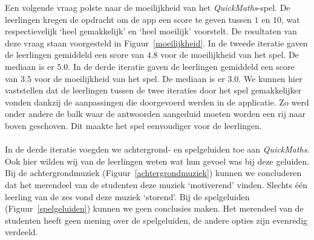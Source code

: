 \documentclass[11pt]{article}
\begin{document}
Een volgende vraag polste naar de moeilijkheid van het \textit{QuickMaths}-spel. De leerlingen kregen de opdracht om de app een score te geven tussen $1$ en $10$, wat respectievelijk `heel gemakkelijk' en `heel moeilijk' voorstelt. De resultaten van deze vraag staan voorgesteld in Figuur~\ref{moeilijkheid}.
In de tweede iteratie gaven de leerlingen gemiddeld een score van $4.8$ voor de moeilijkheid van het spel. De mediaan is er $5.0$.
In de derde iteratie gaven de leerlingen gemiddeld een score van $3.5$ voor de moeilijkheid van het spel. De mediaan is er $3.0$.
We kunnen hier vaststellen dat de leerlingen tussen de twee iteraties door het spel gemakkelijker vonden dankzij de aanpassingen die doorgevoerd werden in de applicatie. Zo werd onder andere de balk waar de antwoorden aangeduid moeten worden een rij naar boven geschoven. Dit maakte het spel eenvoudiger voor de leerlingen.\\\\
In de derde iteratie voegden we achtergrond- en spelgeluiden toe aan \textit{QuickMaths}. Ook hier wilden wij van de leerlingen weten wat hun gevoel was bij deze geluiden. Bij de achtergrondmuziek (Figuur~\ref{achtergrondmuziek}) kunnen we concluderen dat het merendeel van de studenten deze muziek `motiverend' vinden. Slechts \'e\'en leerling van de zes vond deze muziek `storend'. Bij de spelgeluiden (Figuur~\ref{spelgeluiden}) kunnen we geen conclusies maken. Het merendeel van de studenten heeft geen mening over de spelgeluiden, de andere opties zijn evenredig verdeeld.
\end{document}
